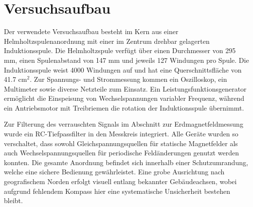 \section{Versuchsaufbau}
\label{sec:Versucshaufbau}

Der verwendete Versuchsaufbau besteht im Kern aus einer Helmholtzspulenanordnung mit einer im Zentrum drehbar gelagerten Induktionsspule. Die Helmholtzspule verfügt über einen Durchmesser von 295 mm, einen Spulenabstand von 147 mm und jeweils 127 Windungen pro Spule. Die Induktionsspule weist 4000 Windungen auf und hat eine Querschnittsfläche von 41.7 cm$^2$. Zur Spannungs- und Strommessung kommen ein Oszilloskop, ein Multimeter sowie diverse Netzteile zum Einsatz. Ein Leistungsfunktionsgenerator ermöglicht die Einspeisung von Wechselspannungen variabler Frequenz, während ein Antriebsmotor mit Treibriemen die rotation der Induktionsspule übernimmt.

Zur Filterung des verrauschten Signals im Abschnitt zur Erdmagnetfeldmessung wurde ein RC-Tiefpassfilter in den Messkreis integriert. Alle Geräte wurden so verschaltet, dass sowohl Gleichspannungsquellen für statische Magnetfelder als auch Wechselspannungsquellen für periodische Feldänderungen genutzt werden konnten. Die gesamte Anordnung befindet sich innerhalb einer Schutzumrandung, welche eine sichere Bedienung gewährleistet. Eine grobe Ausrichtung nach geografischem Norden erfolgt visuell entlang bekannter Gebäudeachsen, wobei aufgrund fehlendem Kompass hier eine systematische Unsicherheit bestehen bleibt.